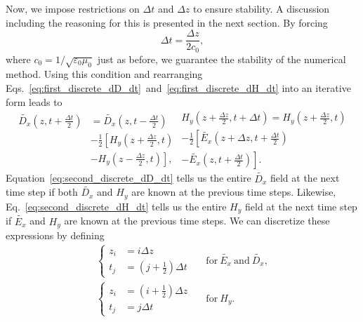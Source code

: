 \documentclass[12pt,twocolumn]{article}
\begin{document}
Now, we impose restrictions on $\Delta t$ and $\Delta z$ to ensure stability. A discussion including the reasoning for this is presented in the next section. By forcing
\begin{equation}
\Delta t=\frac{\Delta z}{2c_0},
\end{equation}
 where $c_0=1/\sqrt{\varepsilon_0\mu_0}$ just as before, we guarantee the stability of the numerical method. Using this condition and rearranging Eqs.~\ref{eq:first_discrete_dD_dt}~and~\ref{eq:first_discrete_dH_dt} into an iterative form leads to
\begin{subequations}
\begin{equation}
\label{eq:second_discrete_dD_dt}\begin{split}
\tilde{D_x}\left(z,t+\frac{\Delta t}{2}\right)&=\tilde{D_x}\left(z,t-\frac{\Delta t}{2}\right) \\
&   -\frac{1}{2}\left[H_y\left(z+\frac{\Delta z}{2},t\right)\right. \\
&- \left. H_y\left(z-\frac{\Delta z}{2},t\right)\right],
\end{split}
\end{equation}
\begin{equation}
\label{eq:second_discrete_dH_dt}\begin{split}
H_y\left(z+\frac{\Delta z}{2},t+\Delta t\right)=H_y\left(z+\frac{\Delta z}{2},t\right) \\
     -\frac{1}{2}\left[\tilde{E_x}\left(z+\Delta z,t+\frac{\Delta t}{2}\right)\right. \\
\left. -\tilde{E_x}\left(z,t+\frac{\Delta t}{2}\right)\right].
\end{split}
\end{equation}
\end{subequations}
Equation~\ref{eq:second_discrete_dD_dt} tells us the entire $\tilde{D_x}$ field at the next time step if both $\tilde{D_x}$ and $H_y$ are known at the previous time steps. Likewise, Eq.~\ref{eq:second_discrete_dH_dt} tells us the entire $H_y$ field at the next time step if $\tilde{E_x}$ and $H_y$ are known at the previous time steps. We can discretize these expressions by defining
\begin{equation}
\begin{aligned}
\left\{
\begin{split}
z_i&=i\Delta z \\
t_j&=\left(j+\frac{1}{2}\right)\Delta t
\end{split}\right.~~&~\mathrm{for}~\tilde{E_x}~\mathrm{and}~\tilde{D_x}, \\
\left\{
\begin{split}
z_i&=\left(i+\frac{1}{2}\right)\Delta z \\
t_j&=j\Delta t
\end{split}\right.~~&~\mathrm{for}~H_y.
\end{aligned}
\end{equation}
\end{document}
